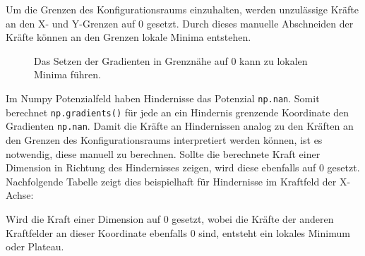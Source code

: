 Um die Grenzen des Konfigurationsraums einzuhalten, werden unzulässige Kräfte an den X- und Y-Grenzen auf $0$ gesetzt. Durch dieses manuelle Abschneiden der Kräfte können an den Grenzen lokale Minima entstehen.
\begin{figure}[H]
	\centering
	\footnotesize
	\centerline{\resizebox{0.65\linewidth}{!}{}}
	\caption{Das Setzen der Gradienten in Grenznähe auf $0$ kann zu lokalen Minima führen.}
\end{figure}
\vspace*{-0.1cm}
Im Numpy Potenzialfeld haben Hindernisse das Potenzial \texttt{np.nan}. Somit berechnet \texttt{np.gradients()} für jede an ein Hindernis grenzende Koordinate den Gradienten \texttt{np.nan}.
Damit die Kräfte an Hindernissen analog zu den Kräften an den Grenzen des Konfigurationsraums interpretiert werden können, ist es notwendig, diese manuell zu berechnen.
Sollte die berechnete Kraft einer Dimension in Richtung des Hindernisses zeigen, wird diese ebenfalls auf $0$ gesetzt. Nachfolgende Tabelle zeigt dies beispielhaft für Hindernisse im Kraftfeld der X-Achse:
\begin{table}[H]
\centerline{}
\end{table}
Wird die Kraft einer Dimension auf $0$ gesetzt, wobei die Kräfte der anderen Kraftfelder an dieser Koordinate ebenfalls $0$ sind, entsteht ein lokales Minimum oder Plateau.

